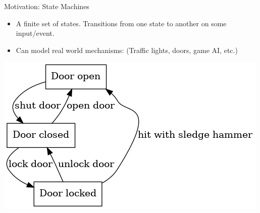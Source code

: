 \documentclass{beamer}
\begin{document}
\begin{frame}{Motivation: State Machines}
    \begin{itemize}
    \item A finite set of states. Transitions from one state to another on some input/event.
    \item Can model real world mechanisms: (Traffic lights, doors, game AI, etc.)
    \end{itemize}

    \includegraphics[scale=0.5]{doors.dot.png}
\end{frame}
%
%
%
%
%
\end{document}
